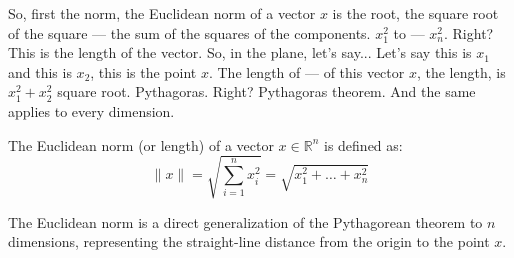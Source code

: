 \begin{spoken-clean}[00:21:18 - 00:22:37]
So, first the norm, the Euclidean norm of a vector $x$ is the root, the square root of the square --- the sum of the squares of the components. $x_1^2$ to --- $x_n^2$. Right?  This is the length of the vector. So, in the plane, let's say...  Let's say this is $x_1$ and this is $x_2$, this is the point $x$. The length of --- of this vector $x$, the length, is $x_1^2 + x_2^2$ square root. Pythagoras. Right? Pythagoras theorem. And the same applies to every dimension.
\end{spoken-clean}

\begin{math-stroke}
The Euclidean norm (or length) of a vector $x \in \mathbb{R}^n$ is defined as:
\[ \|x\| = \sqrt{\sum_{i=1}^n x_i^2} = \sqrt{x_1^2 + \dots + x_n^2} \]

\begin{center}
\end{center}

\begin{explanation-of-steps}
The Euclidean norm is a direct generalization of the Pythagorean theorem to $n$ dimensions, representing the straight-line distance from the origin to the point $x$.
\end{explanation-of-steps}
\end{math-stroke}

